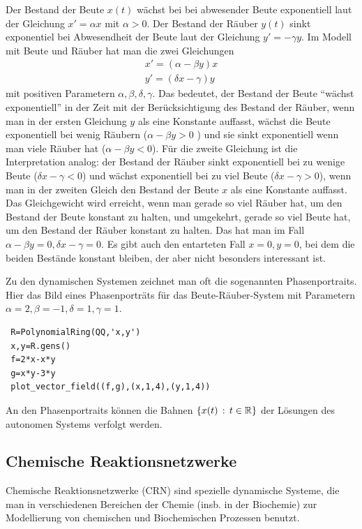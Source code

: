 \documentclass[11pt]{article}
\numberwithin{equation}{section}
\begin{document}
Der Bestand der Beute $x(t)$ wächst bei bei abwesender Beute exponentiell laut der Gleichung $x' = \alpha x$ mit $\alpha > 0$. Der Bestand der Räuber $y(t)$ sinkt exponentiel bei Abwesendheit der Beute laut der Gleichung $y' = - \gamma y$. Im Modell mit Beute und Räuber hat man die zwei Gleichungen 
\begin{align*}
		x' = (\alpha - \beta  y) x
	\\	y'= (\delta x - \gamma) y
\end{align*} 
mit positiven Parametern $\alpha, \beta, \delta, \gamma$. Das bedeutet, der Bestand der Beute ``wächst exponentiell''  in der Zeit mit der Berücksichtigung des Bestand der Räuber, wenn man in der ersten Gleichung $y$ als eine Konstante auffasst, wächst die Beute exponentiell bei wenig Räubern ($\alpha - \beta y >0$ ) und sie sinkt exponentiell wenn man viele Räuber hat ($\alpha - \beta y < 0$). Für die zweite Gleichung ist die Interpretation analog: der Bestand der Räuber sinkt exponentiell bei zu wenige Beute ($\delta x - \gamma <0$) und wächst exponentiell bei zu viel Beute ($\delta x - \gamma >0$), wenn man in der zweiten Gleich den Bestand der Beute $x$ als eine Konstante auffasst. Das Gleichgewicht wird erreicht, wenn man gerade so viel Räuber hat, um den Bestand der Beute konstant zu halten, und umgekehrt, gerade so viel Beute hat, um den Bestand der Räuber konstant zu halten. Das hat man im Fall $\alpha - \beta y =0, \delta x - \gamma = 0$. Es gibt auch den entarteten Fall $x=0,y=0$, bei dem die beiden Bestände konstant bleiben, der aber nicht besonders interessant ist.

Zu den dynamischen Systemen zeichnet man oft die sogenannten Phasenportraits.  Hier das Bild eines Phasenporträts für das Beute-Räuber-System mit Parametern $\alpha = 2, \beta = -1, \delta = 1, \gamma =1$. 
 
 \begin{lstlisting} 
 R=PolynomialRing(QQ,'x,y')
 x,y=R.gens()
 f=2*x-x*y
 g=x*y-3*y
 plot_vector_field((f,g),(x,1,4),(y,1,4))
 \end{lstlisting}

An den Phasenportraits können die Bahnen $\left\{  x(t) \,:\,  t \in \mathbb{R} \right\}$ der Lösungen des autonomen Systems verfolgt werden. 

\subsection{Chemische Reaktionsnetzwerke} 

Chemische Reaktionsnetzwerke (CRN) sind spezielle dynamische Systeme, die man in verschiedenen Bereichen der Chemie (insb. in der Biochemie) zur Modellierung von chemischen und Biochemischen Prozessen benutzt.
\end{document}
